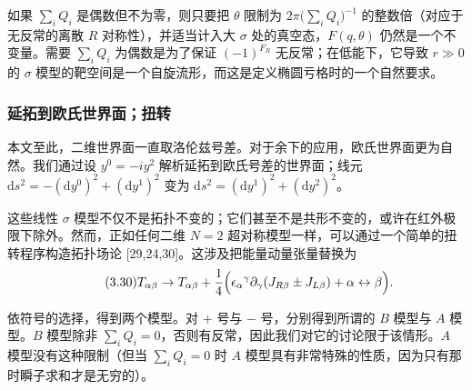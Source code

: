 如果 $\sum_{i}Q_{i}$ 是偶数但不为零，则只要把 $\theta$ 限制为 $2\pi\bigl(\sum_{i}Q_{i}\bigr)^{-1}$ 的整数倍（对应于无反常的离散 $R$ 对称性），并适当计入大 $\sigma$ 处的真空态，$F(q,\theta)$ 仍然是一个不变量。需要 $\sum_{i}Q_{i}$ 为偶数是为了保证 $(-1)^{F_{R}}$ 无反常；在低能下，它导致 $r\gg0$ 的 $\sigma$ 模型的靶空间是一个自旋流形，而这是定义椭圆亏格时的一个自然要求。


\label{op:33}

\subsubsection*{延拓到欧氏世界面；扭转}

本文至此，二维世界面一直取洛伦兹号差。对于余下的应用，欧氏世界面更为自然。我们通过设 $y^{0}=-iy^{2}$ 解析延拓到欧氏号差的世界面；线元 $\mathrm{d}s^{2}=-(\mathrm{d}y^{0})^{2}+(\mathrm{d}y^{1})^{2}$ 变为 $\mathrm{d}s^{2}=(\mathrm{d}y^{1})^{2}+(\mathrm{d}y^{2})^{2}$。

这些线性 $\sigma$ 模型不仅不是拓扑不变的；它们甚至不是共形不变的，或许在红外极限下除外。然而，正如任何二维 $N=2$ 超对称模型一样，可以通过一个简单的扭转程序构造拓扑场论 [29,24,30]。这涉及把能量动量张量替换为
\begin{equation}
\tag{3.30}
T_{\alpha\beta}\to T_{\alpha\beta}+\frac{1}{4}\Bigl(\epsilon_{\alpha}{}^{\gamma}\partial_{\gamma}(J_{R\beta}\pm J_{L\beta})+\alpha\leftrightarrow\beta\Bigr).
\end{equation}

依符号的选择，得到两个模型。对 $+$ 号与 $-$ 号，分别得到所谓的 $B$ 模型与 $A$ 模型。$B$ 模型除非 $\sum_{i}Q_{i}=0$，否则有反常，因此我们对它的讨论限于该情形。$A$ 模型没有这种限制（但当 $\sum_{i}Q_{i}=0$ 时 $A$ 模型具有非常特殊的性质，因为只有那时瞬子求和才是无穷的）。



